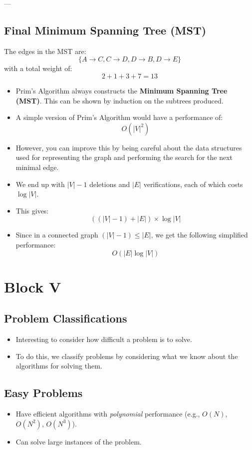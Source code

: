 \documentclass[a4paper,12pt]{article}
\begin{document}
---

\subsection*{Final Minimum Spanning Tree (MST)}

The edges in the MST are:
\[
\{ A \to C, C \to D, D \to B, D \to E \}
\]
with a total weight of:
\[
2 + 1 + 3 + 7 = 13
\]

\begin{itemize}[label=$\bullet$]
    \item Prim's Algorithm always constructs the \textbf{Minimum Spanning Tree (MST)}. This can be shown by induction on the subtrees produced.
    \item A simple version of Prim's Algorithm would have a performance of:
    \[
    O(|V|^2)
    \]
    \item However, you can improve this by being careful about the data structures used for representing the graph and performing the search for the next minimal edge.
    \item We end up with \( |V| - 1 \) deletions and \( |E| \) verifications, each of which costs \( \log |V| \).
    \item This gives:
    \[
    ( (|V| - 1) + |E| ) \times \log |V|
    \]
    \item Since in a connected graph \( (|V| - 1) \leq |E| \), we get the following simplified performance:
    \[
    O(|E| \log |V|)
    \]
\end{itemize}

\newpage

\section{Block V}

\subsection{Problem Classifications}


\begin{itemize}[label=$\bullet$]
    \item Interesting to consider how difficult a problem is to solve.
    \item To do this, we classify problems by considering what we know about the algorithms for solving them.
\end{itemize}

\subsection*{Easy Problems}
\begin{itemize}
    \item Have efficient algorithms with \textit{polynomial} performance (e.g., \(O(N)\), \(O(N^2)\), \(O(N^3)\)).
    \item Can solve large instances of the problem.
\end{itemize}
\end{document}
